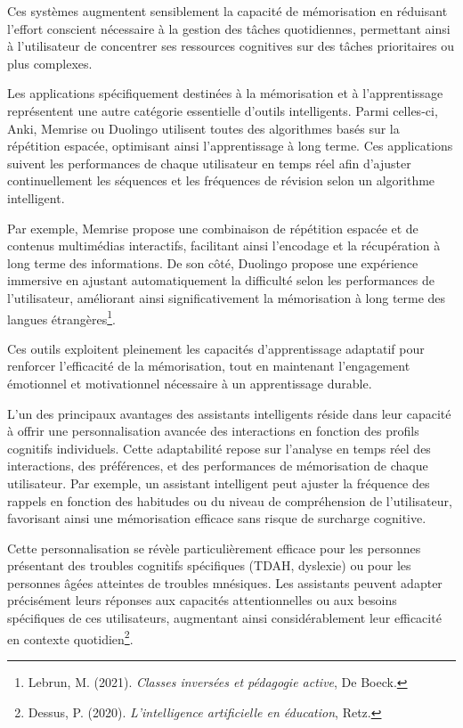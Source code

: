 \documentclass[12pt,a4paper]{report}
\begin{document}
Ces systèmes augmentent sensiblement la capacité de mémorisation en réduisant l’effort conscient nécessaire à la gestion des tâches quotidiennes, permettant ainsi à l’utilisateur de concentrer ses ressources cognitives sur des tâches prioritaires ou plus complexes.

Les applications spécifiquement destinées à la mémorisation et à l’apprentissage représentent une autre catégorie essentielle d’outils intelligents. Parmi celles-ci, Anki, Memrise ou Duolingo utilisent toutes des algorithmes basés sur la répétition espacée, optimisant ainsi l'apprentissage à long terme. Ces applications suivent les performances de chaque utilisateur en temps réel afin d’ajuster continuellement les séquences et les fréquences de révision selon un algorithme intelligent.

Par exemple, Memrise propose une combinaison de répétition espacée et de contenus multimédias interactifs, facilitant ainsi l’encodage et la récupération à long terme des informations. De son côté, Duolingo propose une expérience immersive en ajustant automatiquement la difficulté selon les performances de l’utilisateur, améliorant ainsi significativement la mémorisation à long terme des langues étrangères\footnote{Lebrun, M. (2021). \textit{Classes inversées et pédagogie active}, De Boeck.}.

Ces outils exploitent pleinement les capacités d’apprentissage adaptatif pour renforcer l'efficacité de la mémorisation, tout en maintenant l’engagement émotionnel et motivationnel nécessaire à un apprentissage durable.

L’un des principaux avantages des assistants intelligents réside dans leur capacité à offrir une personnalisation avancée des interactions en fonction des profils cognitifs individuels. Cette adaptabilité repose sur l’analyse en temps réel des interactions, des préférences, et des performances de mémorisation de chaque utilisateur. Par exemple, un assistant intelligent peut ajuster la fréquence des rappels en fonction des habitudes ou du niveau de compréhension de l'utilisateur, favorisant ainsi une mémorisation efficace sans risque de surcharge cognitive.

Cette personnalisation se révèle particulièrement efficace pour les personnes présentant des troubles cognitifs spécifiques (TDAH, dyslexie) ou pour les personnes âgées atteintes de troubles mnésiques. Les assistants peuvent adapter précisément leurs réponses aux capacités attentionnelles ou aux besoins spécifiques de ces utilisateurs, augmentant ainsi considérablement leur efficacité en contexte quotidien\footnote{Dessus, P. (2020). \textit{L’intelligence artificielle en éducation}, Retz.}.
\end{document}
